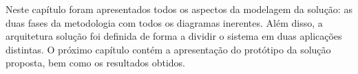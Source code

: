 Neste capítulo foram apresentados todos os aspectos da modelagem da solução: as duas fases da metodologia com todos os diagramas inerentes. Além disso, a arquitetura solução foi definida de forma a dividir o sistema em duas aplicações distintas. O próximo capítulo contém a apresentação do protótipo da solução proposta, bem como os resultados obtidos.
























